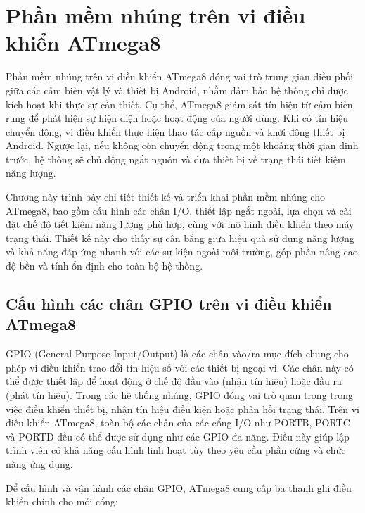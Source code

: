 \documentclass[../DoAn.tex]{subfiles}
\begin{document}
\section{Phần mềm nhúng trên vi điều khiển ATmega8}
\label{section:4.3}
Phần mềm nhúng trên vi điều khiển ATmega8 đóng vai trò trung gian điều phối giữa các cảm biến vật lý và thiết bị Android, nhằm đảm bảo hệ thống chỉ được kích hoạt khi thực sự cần thiết. Cụ thể, ATmega8 giám sát tín hiệu từ cảm biến rung để phát hiện sự hiện diện hoặc hoạt động của người dùng. Khi có tín hiệu chuyển động, vi điều khiển thực hiện thao tác cấp nguồn và khởi động thiết bị Android. Ngược lại, nếu không còn chuyển động trong một khoảng thời gian định trước, hệ thống sẽ chủ động ngắt nguồn và đưa thiết bị về trạng thái tiết kiệm năng lượng.

Chương này trình bày chi tiết thiết kế và triển khai phần mềm nhúng cho ATmega8, bao gồm cấu hình các chân I/O, thiết lập ngắt ngoài, lựa chọn và cài đặt chế độ tiết kiệm năng lượng phù hợp, cùng với mô hình điều khiển theo máy trạng thái. Thiết kế này cho thấy sự cân bằng giữa hiệu quả sử dụng năng lượng và khả năng đáp ứng nhanh với các sự kiện ngoài môi trường, góp phần nâng cao độ bền và tính ổn định cho toàn bộ hệ thống.
\subsection{Cấu hình các chân GPIO trên vi điều khiển ATmega8}
\label{subsection:4.3.1}
GPIO (General Purpose Input/Output) là các chân vào/ra mục đích chung cho phép vi điều khiển trao đổi tín hiệu số với các thiết bị ngoại vi. Các chân này có thể được thiết lập để hoạt động ở chế độ đầu vào (nhận tín hiệu) hoặc đầu ra (phát tín hiệu). Trong các hệ thống nhúng, GPIO đóng vai trò quan trọng trong việc điều khiển thiết bị, nhận tín hiệu điều kiện hoặc phản hồi trạng thái. Trên vi điều khiển ATmega8, toàn bộ các chân của các cổng I/O như PORTB, PORTC và PORTD đều có thể được sử dụng như các GPIO đa năng. Điều này giúp lập trình viên có khả năng cấu hình linh hoạt tùy theo yêu cầu phần cứng và chức năng ứng dụng.


Để cấu hình và vận hành các chân GPIO, ATmega8 cung cấp ba thanh ghi điều khiển chính cho mỗi cổng:
\end{document}
